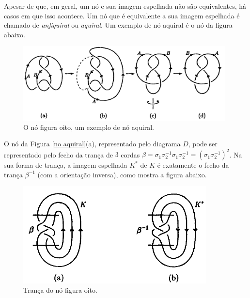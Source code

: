	\par\vspace{0.3cm} Apesar de que, em geral, um nó e sua imagem espelhada não são equivalentes, há casos em que isso acontece. Um nó que é equivalente a sua imagem espelhada é chamado de \textit{anfiquiral} ou \textit{aquiral}. Um exemplo de nó aquiral é o nó da figura abaixo.
	
	\begin{figure}[H]
		\begin{center}
			\includegraphics[width=11cm]{Images/no_aquiral.png}
		\end{center}\caption{O nó figura oito, um exemplo de nó aquiral.}\label{no aquiral}
	\end{figure}
	
	\par\vspace{0.3cm} O nó da Figura \eqref{no aquiral}(a), representado pelo diagrama $D$, pode ser representado pelo fecho da trança de $3$ cordas $\beta = \sigma_1\sigma_2^{-1}\sigma_1\sigma_2^{-1} = (\sigma_1\sigma_2^{-1})^2$. Na sua forma de trança, a imagem espelhada $K^\ast$ de $K$ é exatamente o fecho da trança $\beta^{-1}$ (com a orientação inversa), como mostra a figura abaixo.
	
	\begin{figure}[H]
		\begin{center}
			\includegraphics[width=10cm]{Images/tranca_no_de_oito.png}
		\end{center}\caption{Trança do nó figura oito.}\label{tranca no de oito}
	\end{figure} 
	
